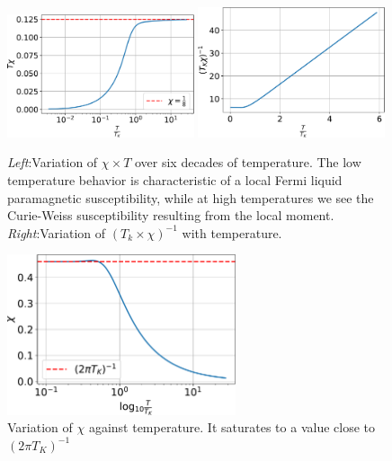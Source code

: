 \documentclass[twoside]{report}
\numberwithin{equation}{section}
\begin{document}
\begin{figure}[htpb!]
	\centering
	\includegraphics[width=0.49\textwidth]{../figures/chi_T_new.pdf}
	\includegraphics[width=0.49\textwidth]{../figures/one_over_chi_new.pdf}
	\caption{\textit{Left}:Variation of $\chi \times T$ over six decades of temperature. The low temperature behavior is characteristic of a local Fermi liquid paramagnetic susceptibility, while at high temperatures we see the Curie-Weiss susceptibility resulting from the local moment. \textit{Right}:Variation of \(\left(T_k \times \chi\right)^{-1}\) with temperature.}
	\label{sus_spin}
\end{figure}
\begin{figure}[htpb]
	\centering
	\includegraphics[width=0.6\textwidth]{../figures/chi_new.pdf}
	\caption{Variation of $\chi$ against temperature. It saturates to a value close to \(\left( 2\pi T_K \right) ^{-1}\)}
	\label{sus_T}
\end{figure}
\end{document}
